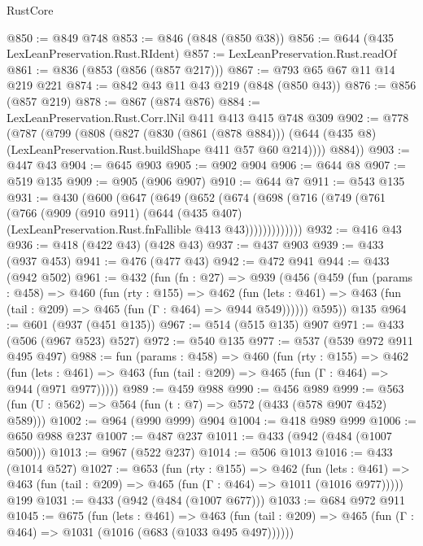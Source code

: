 \begin{lexlean}{RustCore}
\begin{coremodule}
@850 := @849 @748
@853 := @846 (@848 (@850 @38))
@856 := @644 (@435 LexLeanPreservation.Rust.RIdent)
@857 := LexLeanPreservation.Rust.readOf
@861 := @836 (@853 (@856 (@857 @217)))
@867 := @793 @65 @67 @11 @14 @219 @221
@874 := @842 @43 @11 @43 @219 (@848 (@850 @43))
@876 := @856 (@857 @219)
@878 := @867 (@874 @876)
@884 := LexLeanPreservation.Rust.Corr.lNil @411 @413 @415 @748 @309
@902 := @778
    (@787
      (@799
        (@808
          (@827
            (@830 (@861 (@878 @884)))
            (@644 (@435 @8) (LexLeanPreservation.Rust.buildShape @411 @57 @60 @214))))
        @884))
@903 := @447 @43
@904 := @645 @903
@905 := @902 @904
@906 := @644 @8
@907 := @519 @135
@909 := @905 (@906 @907)
@910 := @644 @7
@911 := @543 @135
@931 := @430
    (@600
      (@647
        (@649
          (@652
            (@674
              (@698
                (@716
                  (@749
                    (@761
                      (@766
                        (@909
                          (@910 @911)
                          (@644
                            (@435 @407)
                            (LexLeanPreservation.Rust.fnFallible @413 @43)))))))))))))
@932 := @416 @43
@936 := @418 (@422 @43) (@428 @43)
@937 := @437 @903
@939 := @433 (@937 @453)
@941 := @476 (@477 @43)
@942 := @472 @941
@944 := @433 (@942 @502)
@961 := @432
    (fun (fn : @27) =>
    @939
      (@456
        (@459
          (fun (params : @458) =>
          @460
            (fun (rty : @155) =>
            @462
              (fun (lets : @461) =>
              @463 (fun (tail : @209) => @465 (fun (Γ : @464) => @944 @549))))))
        @595))
    @135
@964 := @601 (@937 (@451 @135))
@967 := @514 (@515 @135) @907
@971 := @433 (@506 (@967 @523) @527)
@972 := @540 @135
@977 := @537 (@539 @972 @911 @495 @497)
@988 := fun (params : @458) =>
  @460
    (fun (rty : @155) =>
    @462
      (fun (lets : @461) => @463 (fun (tail : @209) => @465 (fun (Γ : @464) => @944 (@971 @977)))))
@989 := @459 @988
@990 := @456 @989
@999 := @563 (fun (U : @562) => @564 (fun (t : @7) => @572 (@433 (@578 @907 @452) @589)))
@1002 := @964 (@990 @999) @904
@1004 := @418 @989 @999
@1006 := @650 @988 @237
@1007 := @487 @237
@1011 := @433 (@942 (@484 (@1007 @500)))
@1013 := @967 (@522 @237)
@1014 := @506 @1013
@1016 := @433 (@1014 @527)
@1027 := @653
    (fun (rty : @155) =>
    @462
      (fun (lets : @461) =>
      @463 (fun (tail : @209) => @465 (fun (Γ : @464) => @1011 (@1016 @977)))))
    @199
@1031 := @433 (@942 (@484 (@1007 @677)))
@1033 := @684 @972 @911
@1045 := @675
    (fun (lets : @461) =>
    @463 (fun (tail : @209) => @465 (fun (Γ : @464) => @1031 (@1016 (@683 (@1033 @495 @497))))))

\end{coremodule}
\end{lexlean}
